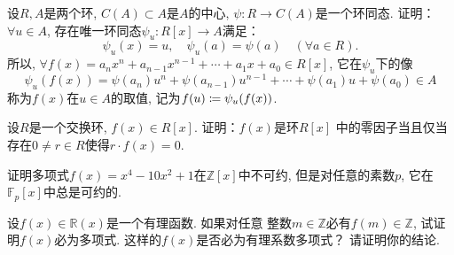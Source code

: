 \begin{solution}
    
\end{solution}

\begin{problem}
    设$R, A$是两个环, $C(A) \subset A$是$A$的中心,
$\psi:R \to C(A)$是一个环同态. 证明：$\forall u \in A$,
存在唯一环同态$\psi_u:R[x] \to A$满足：
\[
    \psi_u(x) = u,\quad \psi_u(a) = \psi(a) \quad (\forall a \in R).
\]
所以, $\forall f(x) = a_nx^n + a_{n - 1}x^{n - 1} + \cdots + a_1x + a_0 \in R[x]$,
它在$\psi_u$下的像
\[
    \psi_u(f(x)) = \psi(a_n)u^n + \psi(a_{n - 1})u^{n - 1} + \cdots + \psi(a_1)u + \psi(a_0) \in A
\]
称为$f(x)$在$u \in A$的取值, 记为$f(u) \mathrel{\coloneqq} \psi_u(f(x))$.
\end{problem}

\begin{solution}
    
\end{solution}

\begin{problem}
    设$R$是一个交换环, $f(x) \in R[x]$. 证明：$f(x)$是环$R[x]$
中的零因子当且仅当存在$0 \neq r \in R$使得$r \cdot f(x) = 0$.
\end{problem}

\begin{solution}
    
\end{solution}

\begin{problem}
    证明多项式$f(x) = x^4 - 10x^2 + 1$在$\mathbb{Z}[x]$中不可约, 
但是对任意的素数$p$, 它在$\mathbb{F}_p[x]$中总是可约的.
\end{problem}

\begin{solution}
    
\end{solution}

\begin{problem}
    设$f(x) \in \mathbb{R}(x)$是一个有理函数. 如果对任意
整数$m \in \mathbb{Z}$必有$f(m) \in \mathbb{Z}$,
试证明$f(x)$必为多项式. 这样的$f(x)$是否必为有理系数多项式？
请证明你的结论.
\end{problem}

\begin{solution}
    
\end{solution}